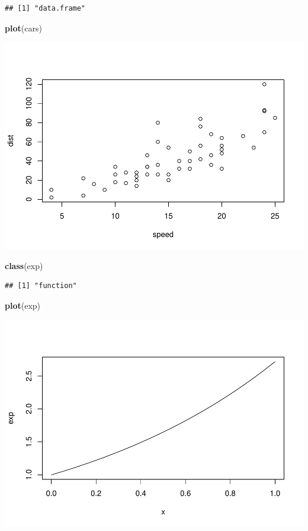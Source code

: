 \documentclass[
]{book}
\newenvironment{Shaded}{\begin{snugshade}}{\end{snugshade}}
\newcommand{\KeywordTok}[1]{\textcolor[rgb]{0.13,0.29,0.53}{\textbf{#1}}}
\newcommand{\NormalTok}[1]{#1}
\theoremstyle{definition}
\theoremstyle{definition}
\theoremstyle{definition}
\theoremstyle{remark}
\begin{document}
\begin{verbatim}
## [1] "data.frame"
\end{verbatim}

\begin{Shaded}
\begin{Highlighting}[]
\KeywordTok{plot}\NormalTok{(cars)}
\end{Highlighting}
\end{Shaded}

\includegraphics{StatisticalMethods_files/figure-latex/unnamed-chunk-195-1.pdf}

\begin{Shaded}
\begin{Highlighting}[]
\KeywordTok{class}\NormalTok{(exp)}
\end{Highlighting}
\end{Shaded}

\begin{verbatim}
## [1] "function"
\end{verbatim}

\begin{Shaded}
\begin{Highlighting}[]
\KeywordTok{plot}\NormalTok{(exp)}
\end{Highlighting}
\end{Shaded}

\includegraphics{StatisticalMethods_files/figure-latex/unnamed-chunk-195-2.pdf}
\end{document}
